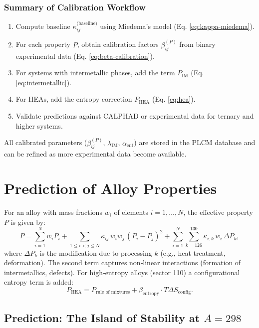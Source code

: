 \documentclass[12pt,a4paper]{article}
\begin{document}
	\subsubsection{Summary of Calibration Workflow}
	
	\begin{enumerate}
		\item Compute baseline \(\kappa_{ij}^{\text{(baseline)}}\) using Miedema's model (Eq. \ref{eq:kappa-miedema}).
		\item For each property \(P\), obtain calibration factors \(\beta_{ij}^{(P)}\) from binary experimental data (Eq. \ref{eq:beta-calibration}).
		\item For systems with intermetallic phases, add the term \(P_{\text{IM}}\) (Eq. \ref{eq:intermetallic}).
		\item For HEAs, add the entropy correction \(P_{\text{HEA}}\) (Eq. \ref{eq:hea}).
		\item Validate predictions against CALPHAD or experimental data for ternary and higher systems.
	\end{enumerate}
	
	All calibrated parameters (\(\beta_{ij}^{(P)}\), \(\lambda_{\text{IM}}\), \(\alpha_{\text{ent}}\)) are stored in the PLCM database and can be refined as more experimental data become available.
	
	
	\section{Prediction of Alloy Properties}
	
	For an alloy with mass fractions \(w_i\) of elements \(i = 1,\dots,N\), the effective property \(P\) is given by:
	\[
	P = \sum_{i=1}^{N} w_i P_i
	+ \sum_{1\le i<j\le N} \kappa_{ij}\, w_i w_j\, (P_i - P_j)^2
	+ \sum_{i=1}^{N} \sum_{k=126}^{130} \kappa_{i,k}\, w_i\, \Delta P_k,
	\]
	where \(\Delta P_k\) is the modification due to processing \(k\) (e.g., heat treatment, deformation). The second term captures non‑linear interactions (formation of intermetallics, defects). For high‑entropy alloys (sector 110) a configurational entropy term is added:
	\[
	P_{\text{HEA}} = P_{\text{rule of mixtures}} + \beta_{\text{entropy}} \cdot T \Delta S_{\text{config}}.
	\]
	
\subsection{Prediction: The Island of Stability at $A=298$}
\end{document}
